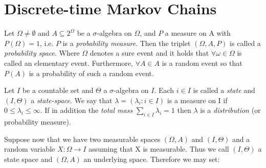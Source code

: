 \nomenclature[g-p]{$\pi$}{ $\simeq 3.14\ldots$}                                             %


\section{Discrete-time Markov Chains} %

Let $\Omega \neq \emptyset$ and $A \subseteq 2^{\Omega}$ be a $\sigma$-algebra on $\Omega$, and $P$ a measure on A with $P(\Omega) = 1$, i.e. $P$ is a {\it probability measure}. Then the triplet $(\Omega, A, P)$ is called a {\it probability space}. Where $\Omega$ denotes a sure event and it holds that $\forall \omega \in \Omega$ is called an elementary event. Furthermore, $\forall A \in A$ is a random event  so that $P(A)$ is a probability of such a random event. 

Let $I$ be a countable set and $\Theta$ a $\sigma$-algebra on $I$. Each $i \in I$ is called a {\it state} and $(I,\Theta)$ a {\it state-space}. We say that $\lambda = (\lambda_i : i \in I) $ is a measure on I if $0 \leq \lambda_i \leq \infty$. If in addition the {\it total mass} $\sum_{i \in I} \lambda_i = 1$ then $\lambda$ is a {\it distribution} (or probability measure). 

Suppose now that we have two measurable spaces $(\Omega,A)$ and $(I,\Theta)$ and a random variable $X: \Omega \rightarrow I$ assuming that X is measurable. Thus we call $(I,\Theta)$ a state space and $(\Omega, A)$ an underlying space. Therefore we may set:

